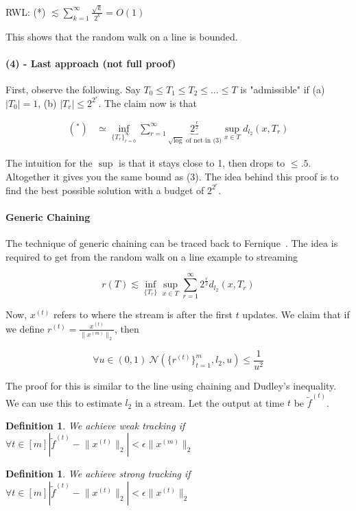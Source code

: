 \documentclass[11pt]{article}
\newtheorem{definition}[theorem]{Definition}
\begin{document}
RWL: (*) $\lesssim \sum_{k=1}^\infty \frac{\sqrt{k}}{2^k} = O(1)$

This shows that the random walk on a line is bounded. 


\paragraph{(4) - Last approach (not full proof)} First, observe the following. Say $T_0 \leq T_1 \leq T_2 \leq \ldots \leq T$ is "admissible" if (a) $|T_0| = 1$, (b) $|T_r| \leq 2^{2^r}$. The claim now is that 

\begin{align*}
(^*) &\simeq \inf_{\{T_r\}_{r=0}^\infty} \sum_{r=1}^\infty \underbrace{2^{\frac{r}{2}}}_{\sqrt{\log} \text{ of net in (3)}} \sup_{x\in T} d_{l_2}(x,T_r)
\end{align*}

The intuition for the $\sup$ is that it stays close to 1, then drops to $\leq .5$. Altogether it gives you the same bound as (3). The idea behind this proof is to find the best possible solution with a budget of $2^{2^r}$.

\paragraph{Generic Chaining} The technique of generic chaining can be traced back to Fernique~\cite{Fernique75}. The idea is required to get from the random walk on a line example to streaming

\begin{equation*}
r(T) \lesssim \inf_{\{T_r\}} \sup_{x\in T} \sum_{r=1}^\infty 2^{\frac{r}{2}} d_{l_2}(x,T_r)
\end{equation*}

Now, $x^{(t)}$ refers to where the stream is after the first $t$ updates. We claim that if we define $r^{(t)} = \frac{x^{(t)}}{\lVert x^{(m)} \rVert_2}$, then 

\begin{equation*}
\forall u \in (0,1) \ \mathcal{N}(\{r^{(t)}\}_{t=1}^m, l_2, u) \leq \frac{1}{u^2}
\end{equation*}

The proof for this is similar to the line using chaining and Dudley's inequality. We can use this to estimate $l_2$ in a stream. Let the output at time $t$ be $\tilde{f}^{(t)}$. 

\begin{definition}
We achieve weak tracking if $\forall t \in [m] |\tilde{f}^{(t)} - \lVert x^{(t)} \rVert_2 | < \epsilon \lVert x^{(m)} \rVert_2$
\end{definition}
\begin{definition}
We achieve strong tracking if $\forall t \in [m] |\tilde{f}^{(t)} - \lVert x^{(t)} \rVert_2 | < \epsilon \lVert x^{(t)} \rVert_2$
\end{definition}
\end{document}
